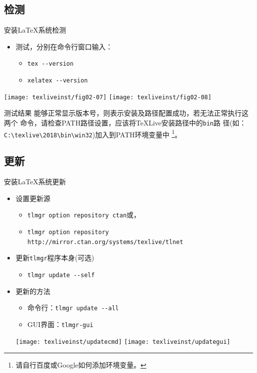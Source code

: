 \documentclass[xcolor=svgnames, t, 10pt]{ctexbeamer}%
\begin{document}
\subsection[检测]{检测\TeXLive }
\begin{frame}[t,fragile]{安装\LaTeX 系统}{检测\TeXLive }
  \begin{itemize}
  \item 测试，分别在命令行窗口输入：
    \begin{itemize}
    \item {\verb|tex --version|}
    \item {\verb|xelatex --version|}
    \end{itemize}
  \end{itemize}
  \centering \hfill
  \texttt{[image: texliveinst/fig02-07]}
  \hfill
  \texttt{[image: texliveinst/fig02-08]}
  \begin{block}{测试结果}
    能够正常显示版本号，则表示安装及路径配置成功，若无法正常执行这两个
    命令，请检查PATH路径设置，应该将{\TeX}Live安装路径中的\verb|bin|路
    径(如：\verb|C:\texlive\2018\bin\win32|)加入到PATH环境变量中
    \footnote[frame]{请自行百度或Google如何添加环境变量。}。
  \end{block}
\end{frame}

\subsection[更新]{更新\TeXLive }
\begin{frame}[t,fragile]{安装\LaTeX 系统}{更新\TeXLive}
  \stretchon
  \begin{itemize}
  \item 设置更新源
    \begin{itemize}
    \item \texttt{tlmgr option repository ctan}或，%
    \item \texttt{tlmgr option repository http://mirror.ctan.org/systems/texlive/tlnet}%
    \end{itemize}
  \item 更新{\verb|tlmgr|}程序本身(可选)
    \begin{itemize}
    \item {\verb|tlmgr update --self|}%
    \end{itemize}
  \item 更新\TeXLive 的方法
    \begin{itemize}
    \item 命令行：{\verb|tlmgr update --all|}%
    \item GUI界面：{\verb|tlmgr-gui|}%
    \end{itemize}
    \stretchoff
    \begin{center}
      \texttt{[image: texliveinst/updatecmd]}\quad
      \texttt{[image: texliveinst/updategui]}
    \end{center}
  \end{itemize}
\end{frame}
\end{document}
